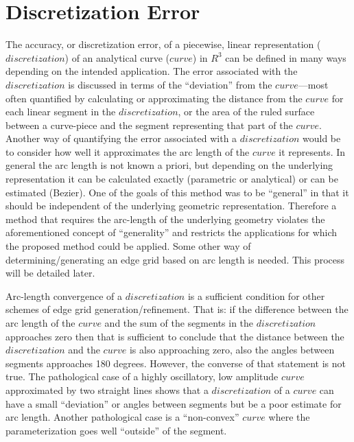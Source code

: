 \section{Discretization Error}
The accuracy, or discretization error, of a piecewise, linear 
representation ($discretization$) of an analytical curve ($curve$) in 
$R^3$ can be defined in many ways depending on the intended application.  
The error associated with the $discretization$ is discussed in terms of 
the ``deviation'' from the $curve$—most often quantified by calculating or 
approximating the distance from the $curve$ for each linear segment in the 
$discretization$, or the area of the ruled surface between a curve-piece 
and the segment representing that part of the $curve$.  Another way of 
quantifying the error associated with a $discretization$ would be to 
consider how well it approximates the arc length of the $curve$ it 
represents.  In general the arc length is not known a priori, but 
depending on the underlying representation it can be calculated exactly 
(parametric or analytical) or can be estimated (Bezier).  One of the goals 
of this method was to be ``general'' in that it should be independent of 
the underlying geometric representation.  Therefore a method that requires the 
arc-length of the underlying geometry violates the aforementioned concept 
of ``generality'' and restricts the applications for which the proposed 
method could be applied.  Some other way of determining/generating an edge 
grid based on arc length is needed.  This process will be detailed later.

Arc-length convergence of a $discretization$ is a sufficient condition for 
other schemes of edge grid generation/refinement.  That is: if the 
difference between the arc length of the $curve$ and the sum of the 
segments in the $discretization$ approaches zero then that is sufficient 
to conclude that the distance between the $discretization$ and the $curve$ 
is also approaching zero, also the angles between segments approaches 180 
degrees.  However, the converse of that statement is not true.  The 
pathological case of a highly oscillatory, low amplitude $curve$ 
approximated by two straight lines shows that a $discretization$ of a 
$curve$ can have a small ``deviation'' or angles between segments but be a 
poor estimate for arc length.  Another pathological case is a 
``non-convex'' $curve$ where the parameterization goes well ``outside'' of 
the segment.

